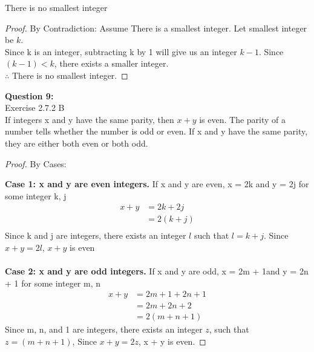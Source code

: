\documentclass[11pt]{article}
\begin{document}
\noindent There is no smallest integer\\
\begin{proof}
By Contradiction: Assume There is a smallest integer. Let smallest integer be $k$.\\
Since k is an integer, subtracting k by 1 will give us an integer $k-1$. Since $(k - 1) < k$,  there exists a smaller integer.\\ $\therefore$ There is no smallest integer.

\end{proof}

\newpage

\noindent \textbf{Question 9:}\\
Exercise 2.7.2 B\\

\noindent If integers x and y have the same parity, then $x + y$ is even. The parity of a number tells whether the number is odd or even. If x and y have the same parity, they are either both even or both odd.\\

\begin{proof}
By Cases:

\noindent \textbf{Case 1:  x and y are even integers.} If x and y are even, x = 2k and y = 2j for some integer k, j\\
\begin{align*}
x + y &= 2k + 2j\\
&= 2(k + j)\\
\end{align*}
Since k and j are integers, there exists an integer $l$ such that $l = k + j$. Since $x + y = 2l$, $x + y$ is even\\\\

\noindent \textbf{Case 2:  x and y are odd integers.} If x and y are odd, x = 2m + 1and y = 2n + 1 for some integer m, n\\
\begin{align*}
x + y &= 2m + 1 + 2n + 1\\
&= 2m + 2n + 2\\
&= 2(m + n + 1)
\end{align*}
Since m, n, and 1 are integers, there exists an integer $z$, such that $z = (m + n + 1)$, Since $x + y = 2z$, x + y is even.
\end{proof}
\end{document}
